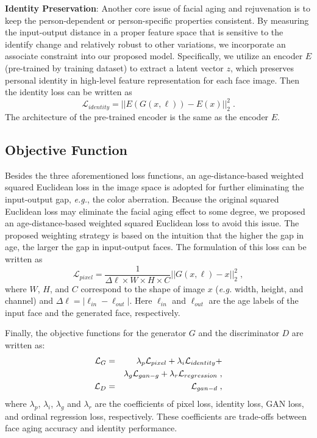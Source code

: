 \documentclass{article}
\begin{document}
{\bf\noindent Identity Preservation}:
Another core issue of facial aging and rejuvenation is to keep the person-dependent or person-specific properties consistent. By measuring the input-output distance in a proper feature space that is sensitive to the identify change and relatively robust to other variations, we incorporate an associate constraint into our proposed model. Specifically, we utilize an encoder $E$ (pre-trained by training dataset) to extract a latent vector $z$, which preserves personal identity in high-level feature representation for each face image. Then the identity loss can be written as
\begin{equation}
\mathcal{L}_{identity} = ||E(G(x, \ell)) -  E(x)||_2^2\;.
\end{equation}
The architecture of the pre-trained encoder is the same as the encoder $E$.

\subsection{Objective Function}\label{objective}
Besides the three aforementioned loss functions, an age-distance-based weighted squared Euclidean loss in the image space is adopted for further eliminating the input-output gap, {\it e.g.}, the color aberration. Because the original squared Euclidean loss may eliminate the facial aging effect to some degree, we proposed an age-distance-based weighted squared Euclidean loss to avoid this issue. The proposed weighting strategy is based on the intuition that the higher the gap in age, the larger the gap in input-output faces. The formulation of this loss can be written as
\begin{equation}
\mathcal{L}_{pixel} = \frac{1}{{\Delta \ell}\times W\times H\times C}||G(x, \ell) - x||_2^2\;,
\end{equation}
where $W$, $H$, and $C$ correspond to the shape of image $x$ ({\it e.g.} width, height, and channel) and $\Delta \ell = |\ell_{in} - \ell_{out}|$. Here $\ell_{in}$ and $\ell_{out}$ are the age labels of the input face and the generated face, respectively.

Finally, the objective functions for the generator $G$ and the discriminator $D$ are written as:
\begin{eqnarray}
\mathcal{L}_{G} &=& \lambda_p\mathcal{L}_{pixel} + \lambda_i\mathcal{L}_{identity} +\label{gan_g}\\ 
&& \lambda_g\mathcal{L}_{gan-g} + \lambda_r\mathcal{L}_{regression}\;,\notag 
\\
\mathcal{L}_{D} &=& \mathcal{L}_{gan-d}\label{gan_d}\;,
\end{eqnarray}
where $\lambda_p$, $\lambda_i$, $\lambda_g$ and $\lambda_r$ are the coefficients of pixel loss, identity loss, GAN loss, and ordinal regression loss, respectively. These coefficients are trade-offs between face aging accuracy and identity performance.
\end{document}
